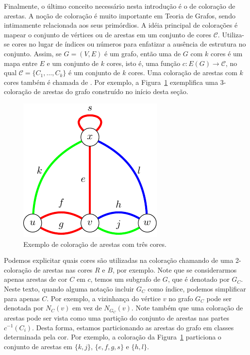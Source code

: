 Finalmente, o último conceito necessário nesta introdução é o de coloração de arestas. A noção de coloração é muito importante em Teoria de Grafos, sendo intimamente relacionada aos seus primórdios. A idéia principal de colorações é mapear o conjunto de vértices ou de arestas em um conjunto de cores $\mathcal{C}$. Utiliza-se cores no lugar de índices ou números para enfatizar a ausência de estrutura no conjunto. Assim, se $G = (V,E)$ é um grafo, então uma  de $G$ com $k$ cores é um mapa entre $E$ e um conjunto de $k$ cores, isto é, uma função $c: E(G) \to \mathcal{C}$, no qual $\mathcal{C} = \{ C_1, \dots, C_k\}$ é um conjunto de $k$ cores.
Uma coloração de arestas com $k$ cores também é chamada de . Por exemplo, a Figura~\ref{fig:intro:excolouring} exemplifica uma 3-coloração de arestas do grafo construído no início desta seção.

\begin{figure}[ht!]
\centering
\includegraphics{figures/1_intro_4_excolouring}
\caption{Exemplo de coloração de arestas com três cores.}
\label{fig:intro:excolouring}
\end{figure}

Podemos explicitar quais cores são utilizadas na coloração chamando de  uma 2-coloração de arestas nas cores $R$ e $B$, por exemplo. Note que se considerarmos apenas arestas de cor $C$ em $c$, temos um subgrafo de $G$, que é denotado por $G_C$.
Neste texto, quando alguma notação incluir $G_C$ como índice, podemos simplificar para apenas $C$. Por exemplo, a vizinhança do vértice $v$ no grafo $G_C$ pode ser denotada por $N_C(v)$ em vez de $N_{G_C}(v)$.
Note também que uma coloração de arestas pode ser vista como uma partição do conjunto de arestas nas partes $c^{-1}(C_i)$. Desta forma, estamos particionando as arestas do grafo em classes determinada pela cor. Por exemplo, a coloração da Figura~\ref{fig:intro:excolouring} particiona o conjunto de arestas em $\{k,j\}$, $\{e,f,g,s\}$ e $\{h,l\}$.

